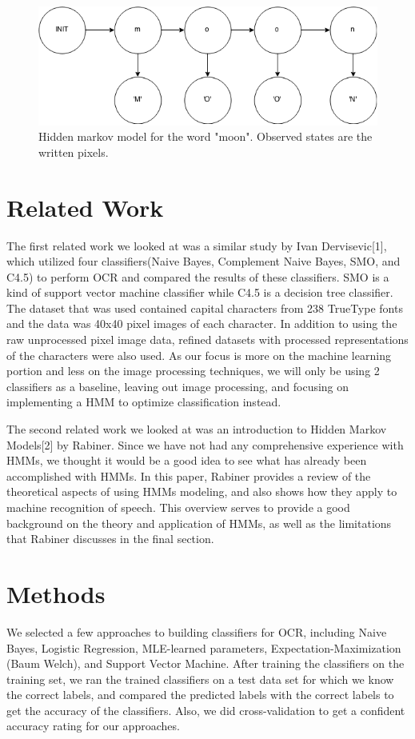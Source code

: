 \documentclass{article} %
\begin{document}
\begin{figure}[h]
\begin{center}
\includegraphics[scale=0.4]{ml_project_hmm.png}
\end{center}
\caption{Hidden markov model for the word "moon". Observed states are the written pixels.}
\label{fig:hmm-letters}
\end{figure}

\section{Related Work}
The first related work we looked at was a similar study by Ivan Dervisevic[1], which utilized four classifiers(Naive Bayes, Complement Naive Bayes, SMO, and C4.5) to perform OCR and compared the results of these classifiers. SMO is a kind of support vector machine classifier while C4.5 is a decision tree classifier. The dataset that was used contained capital characters from 238 TrueType fonts and the data was 40x40 pixel images of each character. In addition to using the raw unprocessed pixel image data, refined datasets with processed representations of the characters were also used. As our focus is more on the machine learning portion and less on the image processing techniques, we will only be using 2 classifiers as a baseline, leaving out image processing, and focusing on implementing a HMM to optimize classification instead.

The second related work we looked at was an introduction to Hidden Markov Models[2] by Rabiner. Since we have not had any comprehensive experience with HMMs, we thought it would be a good idea to see what has already been accomplished with HMMs. In this paper, Rabiner provides a review of the theoretical aspects of using HMMs modeling, and also shows how they apply to machine recognition of speech. This overview serves to provide a good background on the theory and application of HMMs, as well as the limitations that Rabiner discusses in the final section.

\section{Methods}
We selected a few approaches to building classifiers for OCR, including Naive Bayes, Logistic Regression, MLE-learned parameters, Expectation-Maximization (Baum Welch), and Support Vector Machine. After training the classifiers on the training set, we ran the trained classifiers on a test data set for which we know the correct labels, and compared the predicted labels with the correct labels to get the accuracy of the classifiers. Also, we did cross-validation to get a confident accuracy rating for our approaches. 
\end{document}
